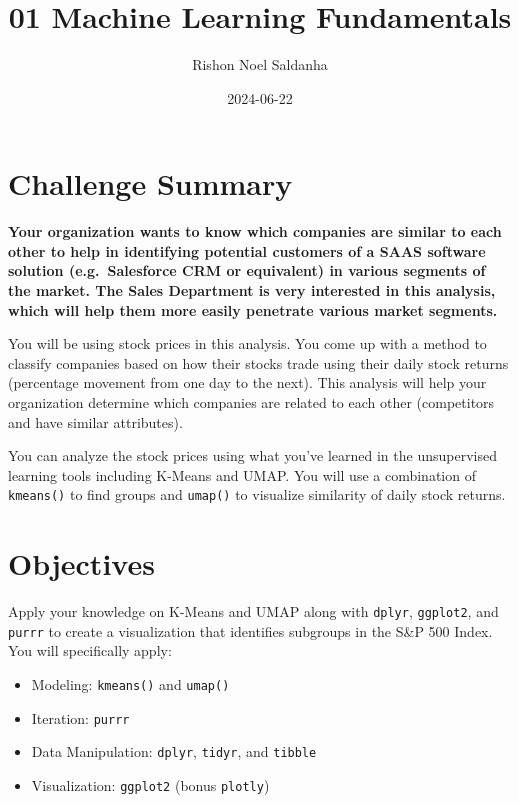 \documentclass[
]{article}
\title{01 Machine Learning Fundamentals}
\author{Rishon Noel Saldanha}
\date{2024-06-22}
\providecommand{\tightlist}{%
  \setlength{\itemsep}{0pt}\setlength{\parskip}{0pt}}
\begin{document}
\maketitle

{
\setcounter{tocdepth}{3}
\tableofcontents
}
\hypertarget{challenge-summary}{%
\section{Challenge Summary}\label{challenge-summary}}

\textbf{Your organization wants to know which companies are similar to
each other to help in identifying potential customers of a SAAS software
solution (e.g.~Salesforce CRM or equivalent) in various segments of the
market. The Sales Department is very interested in this analysis, which
will help them more easily penetrate various market segments.}

You will be using stock prices in this analysis. You come up with a
method to classify companies based on how their stocks trade using their
daily stock returns (percentage movement from one day to the next). This
analysis will help your organization determine which companies are
related to each other (competitors and have similar attributes).

You can analyze the stock prices using what you've learned in the
unsupervised learning tools including K-Means and UMAP. You will use a
combination of \texttt{kmeans()} to find groups and \texttt{umap()} to
visualize similarity of daily stock returns.

\hypertarget{objectives}{%
\section{Objectives}\label{objectives}}

Apply your knowledge on K-Means and UMAP along with \texttt{dplyr},
\texttt{ggplot2}, and \texttt{purrr} to create a visualization that
identifies subgroups in the S\&P 500 Index. You will specifically apply:

\begin{itemize}
\tightlist
\item
  Modeling: \texttt{kmeans()} and \texttt{umap()}
\item
  Iteration: \texttt{purrr}
\item
  Data Manipulation: \texttt{dplyr}, \texttt{tidyr}, and \texttt{tibble}
\item
  Visualization: \texttt{ggplot2} (bonus \texttt{plotly})
\end{itemize}
\end{document}
